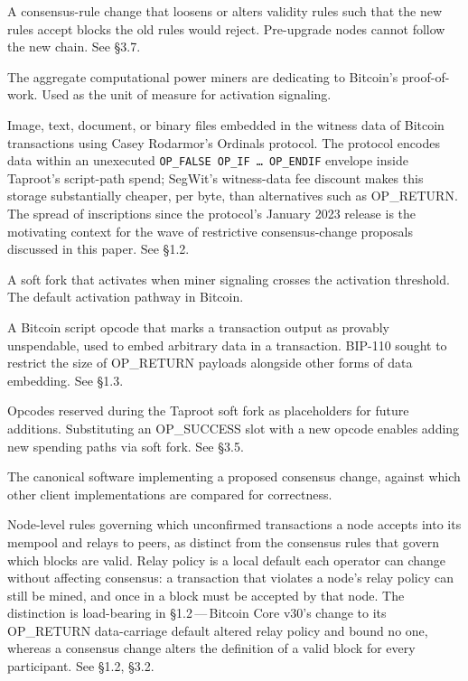 \documentclass[11pt, twoside, openright]{book}
\newcommand{\sect}[1]{\S#1}
\begin{document}
\begin{description}[leftmargin=0pt, labelindent=0pt, style=nextline, itemsep=8pt]
  \item[Hard fork.] A consensus-rule change that loosens or alters validity rules such that the new rules accept blocks the old rules would reject. Pre-upgrade nodes cannot follow the new chain. See \sect{3.7}.

  \item[Hashrate.] The aggregate computational power miners are dedicating to Bitcoin's proof-of-work. Used as the unit of measure for activation signaling.

  \item[Inscriptions.] Image, text, document, or binary files embedded in the witness data of Bitcoin transactions using Casey Rodarmor's Ordinals protocol. The protocol encodes data within an unexecuted \texttt{OP\_FALSE OP\_IF \ldots\ OP\_ENDIF} envelope inside Taproot's script-path spend; SegWit's witness-data fee discount makes this storage substantially cheaper, per byte, than alternatives such as OP\_RETURN. The spread of inscriptions since the protocol's January 2023 release is the motivating context for the wave of restrictive consensus-change proposals discussed in this paper. See \sect{1.2}.

  \item[MASF (Miner-Activated Soft Fork).] A soft fork that activates when miner signaling crosses the activation threshold. The default activation pathway in Bitcoin.

  \item[OP\_RETURN.] A Bitcoin script opcode that marks a transaction output as provably unspendable, used to embed arbitrary data in a transaction. BIP-110 sought to restrict the size of OP\_RETURN payloads alongside other forms of data embedding. See \sect{1.3}.

  \item[OP\_SUCCESS.] Opcodes reserved during the Taproot soft fork as placeholders for future additions. Substituting an OP\_SUCCESS slot with a new opcode enables adding new spending paths via soft fork. See \sect{3.5}.

  \item[Reference implementation.] The canonical software implementing a proposed consensus change, against which other client implementations are compared for correctness.

  \item[Relay policy (standardness).] Node-level rules governing which unconfirmed transactions a node accepts into its mempool and relays to peers, as distinct from the consensus rules that govern which blocks are valid. Relay policy is a local default each operator can change without affecting consensus: a transaction that violates a node's relay policy can still be mined, and once in a block must be accepted by that node. The distinction is load-bearing in \sect{1.2}\,---\,Bitcoin Core v30's change to its OP\_RETURN data-carriage default altered relay policy and bound no one, whereas a consensus change alters the definition of a valid block for every participant. See \sect{1.2}, \sect{3.2}.


\end{description}
\end{document}
